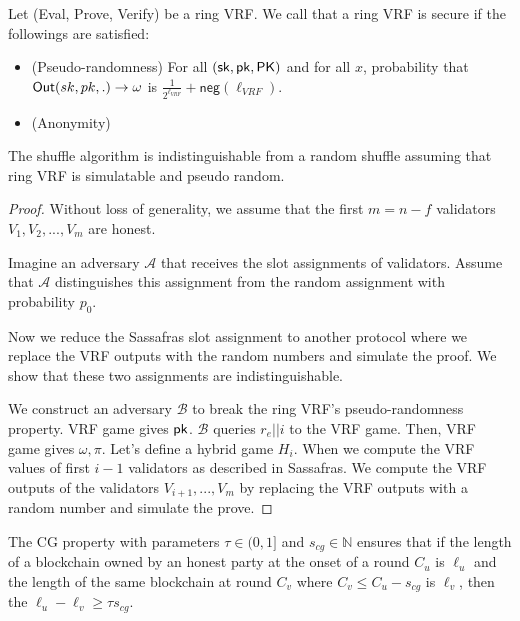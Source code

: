 \begin{definition}
	Let (Eval, Prove, Verify) be a ring VRF. We call that a ring VRF is secure if the followings are satisfied:
	
	\begin{itemize}
		\item (Pseudo-randomness) For all $ (\mathsf{sk}, \mathsf{pk}, \mathsf{PK}) $ and for all $ x $, probability that $ \mathsf{Out}(sk, pk, .)\rightarrow \omega $ is $ \frac{1}{2^{\ell_{VRF}}} + \mathsf{neg}(\ell_{VRF}) $.
		\item (Anonymity)	
	\end{itemize}
	
\end{definition}




\begin{theorem}
	The shuffle algorithm is indistinguishable from a random shuffle assuming that ring VRF is simulatable and pseudo random.
\end{theorem}

\begin{proof}
	Without loss of generality, we assume that the first $ m = n - f$ validators $ V_1, V_2,...,V_m $ are honest. 
	
	Imagine an adversary $ \mathcal{A} $ that receives the slot assignments of validators. Assume that $ \mathcal{A} $ distinguishes this assignment from the random assignment with probability $ p_0 $.
	
	Now we reduce the Sassafras slot assignment to another protocol where we replace the VRF outputs with the random numbers and simulate the proof.
	We show that these two assignments are indistinguishable.
	
	We construct an adversary $ \mathcal{B} $ to break the ring VRF's pseudo-randomness property.  VRF game gives $ \mathsf{pk} $.  $ \mathcal{B} $ queries $ r_e||i $ to the VRF game. Then, VRF game gives $ \omega, \pi $. Let's define a hybrid game $ H_{i} $. When we compute the VRF values of first $ i-1 $ validators as described in Sassafras. We compute the VRF outputs of the validators $ V_{i+1},...,V_m $ by replacing the VRF outputs with a random number and simulate the prove.
\end{proof}


\begin{definition} \label{def:cg}
	The CG  property with parameters $ \tau \in (0,1] $ and $ s_{cg}\in \mathbb{N} $ ensures that if the length of a blockchain owned by an honest party at the onset of a round $ C_u $ is $ \ell_u $ and the length of the same blockchain at round $ C_v  $ where $ C_v \leq C_u - s_{cg}  $ is $\ell_v$, then the $ \ell_u  - \ell_v \geq  \tau s_{cg} $.
\end{definition}

